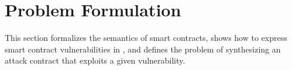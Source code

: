 \section{Problem Formulation}\label{sec:problem}

This section formalizes the semantics of smart contracts, shows how to express smart contract vulnerabilities in \toolname, and 
defines the problem of synthesizing an attack contract that exploits a given vulnerability.%




